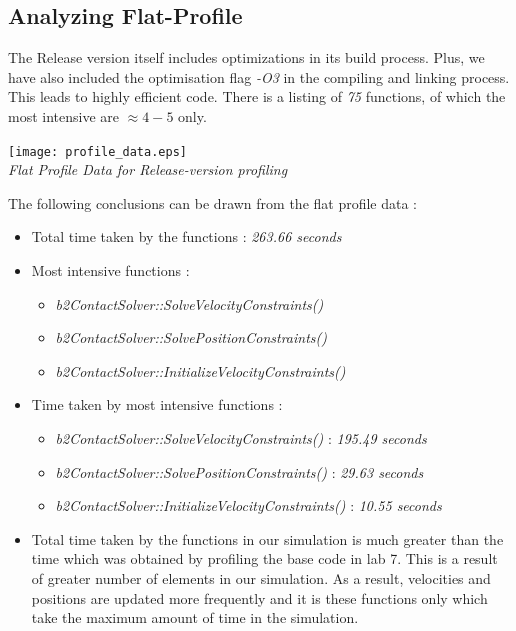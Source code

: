\documentclass[a4paper,11pt]{article}
\begin{document}
\subsection{Analyzing Flat-Profile}

The Release version itself includes optimizations in its build process. Plus, we have also included the optimisation flag \emph{-O3} in the compiling and linking process. This leads to highly efficient code. There is a listing of \emph{75} functions, of which the most intensive are $\approx 4-5$ only. 

\begin{center}
\texttt{[image: profile\_data.eps]}\\
\emph{Flat Profile Data for Release-version profiling}
\end{center}

The following conclusions can be drawn from the flat profile data :

\begin{itemize}

\item Total time taken by the functions : \emph{263.66 seconds}
\item Most intensive functions : 
\begin{itemize}
\item \emph{b2ContactSolver::SolveVelocityConstraints()}
\item \emph{b2ContactSolver::SolvePositionConstraints()}
\item \emph{b2ContactSolver::InitializeVelocityConstraints()}
\end{itemize}
\item Time taken by most intensive functions : 
\begin{itemize}
\item \emph{b2ContactSolver::SolveVelocityConstraints()} : \emph{195.49 seconds}
\item \emph{b2ContactSolver::SolvePositionConstraints()} : \emph{29.63 seconds}
\item \emph{b2ContactSolver::InitializeVelocityConstraints()} : \emph{10.55 seconds}
\end{itemize}
\item Total time taken by the functions in our simulation is much greater than the time which was obtained by profiling the base code in lab 7. This is a result of greater number of elements in our simulation. As a result, velocities and positions are updated more frequently and it is these functions only which take the maximum amount of time in the simulation. 
\end{itemize}
\end{document}
